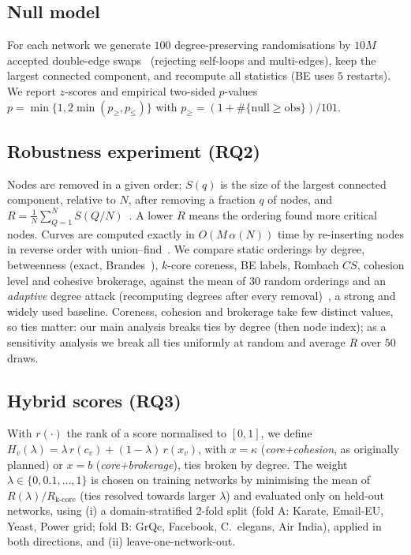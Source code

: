 \documentclass[conference]{IEEEtran}
\newcommand{\coh}{\kappa}
\newcommand{\cn}{c}
\begin{document}
\subsection{Null model}
\label{sec:null}
For each network we generate $100$ degree-preserving randomisations by $10M$ accepted double-edge
swaps~\cite{maslov2002specificity} (rejecting self-loops and multi-edges), keep the largest connected
component, and recompute all statistics (BE uses $5$ restarts). We report $z$-scores and empirical
two-sided $p$-values $p=\min\{1,2\min(p_{\ge},p_{\le})\}$ with $p_{\ge}=(1+\#\{\text{null}\ge\text{obs}\})/101$.

\subsection{Robustness experiment (RQ2)}
Nodes are removed in a given order; $S(q)$ is the size of the largest connected component, relative to
$N$, after removing a fraction $q$ of nodes, and $R=\frac1N\sum_{Q=1}^{N}S(Q/N)$~\cite{schneider2011mitigation}.
A lower $R$ means the ordering found more critical nodes. Curves are computed exactly in
$O(M\,\alpha(N))$ time by re-inserting nodes in reverse order with union--find~\cite{newman2000efficient}.
We compare static orderings by degree, betweenness (exact, Brandes~\cite{brandes2001faster}), $k$-core
coreness, BE labels, Rombach $CS$, cohesion level and cohesive brokerage, against the mean of $30$ random
orderings and an \emph{adaptive} degree attack (recomputing degrees after every removal)~\cite{albert2000error},
a strong and widely used baseline. Coreness, cohesion and brokerage take few distinct values, so ties
matter: our main analysis breaks ties by degree (then node index); as a sensitivity analysis we break
all ties uniformly at random and average $R$ over $50$ draws.

\subsection{Hybrid scores (RQ3)}
With $r(\cdot)$ the rank of a score normalised to $[0,1]$, we define
$H_v(\lambda)=\lambda\,r(\cn_v)+(1-\lambda)\,r(x_v)$, with $x=\coh$ (\emph{core+cohesion}, as originally
planned) or $x=b$ (\emph{core+brokerage}), ties broken by degree. The weight
$\lambda\in\{0,0.1,\dots,1\}$ is chosen on training networks by minimising the mean of $R(\lambda)/R_{\text{k-core}}$
(ties resolved towards larger $\lambda$) and evaluated only on held-out networks, using (i) a
domain-stratified 2-fold split (fold A: Karate, Email-EU, Yeast, Power grid; fold B: GrQc, Facebook,
C.~elegans, Air India), applied in both directions, and (ii) leave-one-network-out.
\end{document}
